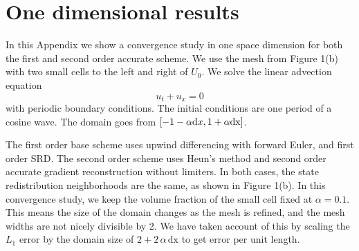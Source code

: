 \appendix
\section{One dimensional results}\label{sec:theory}

In this Appendix we show a convergence study in one space dimension
for both the first and second order accurate scheme.
We use the mesh from Figure 1(b) with two small cells
to the left and right of $U_0$. 
We solve the linear advection equation
\begin{equation}
u_t +  u_x = 0
\end{equation}
with periodic boundary conditions. 
The initial conditions are  one period of a cosine
wave. The domain goes from $[-1-\alpha {\textrm dx}, 1+\alpha \textrm{dx}]$.

The first order base scheme uses upwind differencing with forward Euler,
and first order SRD. The second order scheme uses Heun's
method and second order accurate 
gradient reconstruction without limiters. 
In both cases, the state redistribution neighborhoods are the same, as shown in
Figure 1(b).
In this convergence study, we keep the volume fraction  of the small cell 
fixed at $\alpha=0.1$. This means the size of the domain changes as the mesh is
refined, and the mesh widths are not nicely divisible by 2.  We have taken 
account of this by scaling the $L_1$ error by the domain size 
of $2+2 \, \alpha \, \textrm{dx}$ to get error per unit length.

